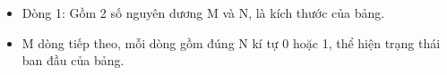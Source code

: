 \begin{itemize}
	\item     Dòng 1: Gồm 2 số nguyên dương M và N, là kích thước của bảng.   
	\item     M dòng tiếp theo, mỗi dòng gồm đúng N kí tự 0 hoặc 1, thể hiện trạng thái ban đầu của bảng.   
\end{itemize}